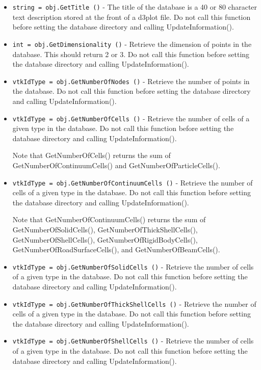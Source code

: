\begin{itemize}
\item  \verb|string = obj.GetTitle ()| -  The title of the database is a 40 or 80 character text description
 stored at the front of a d3plot file.  Do not call this function
 before setting the database directory and calling UpdateInformation().

\item  \verb|int = obj.GetDimensionality ()| -  Retrieve the dimension of points in the database. This should return 2
 or 3.  Do not call this function before setting the database directory
 and calling UpdateInformation().

\item  \verb|vtkIdType = obj.GetNumberOfNodes ()| -  Retrieve the number of points in the database.  Do not call this
 function before setting the database directory and calling
 UpdateInformation().

\item  \verb|vtkIdType = obj.GetNumberOfCells ()| -  Retrieve the number of cells of a given type in the database.  Do not
 call this function before setting the database directory and calling
 UpdateInformation().

 Note that GetNumberOfCells() returns the sum of
 GetNumberOfContinuumCells() and GetNumberOfParticleCells().

\item  \verb|vtkIdType = obj.GetNumberOfContinuumCells ()| -  Retrieve the number of cells of a given type in the database.  Do not
 call this function before setting the database directory and calling
 UpdateInformation().

 Note that GetNumberOfContinuumCells() returns the sum of
 GetNumberOfSolidCells(), GetNumberOfThickShellCells(),
 GetNumberOfShellCells(), GetNumberOfRigidBodyCells(),
 GetNumberOfRoadSurfaceCells(), and GetNumberOfBeamCells().

\item  \verb|vtkIdType = obj.GetNumberOfSolidCells ()| -  Retrieve the number of cells of a given type in the database.  Do not
 call this function before setting the database directory and calling
 UpdateInformation().

\item  \verb|vtkIdType = obj.GetNumberOfThickShellCells ()| -  Retrieve the number of cells of a given type in the database.  Do not
 call this function before setting the database directory and calling
 UpdateInformation().

\item  \verb|vtkIdType = obj.GetNumberOfShellCells ()| -  Retrieve the number of cells of a given type in the database.  Do not
 call this function before setting the database directory and calling
 UpdateInformation().


\end{itemize}
